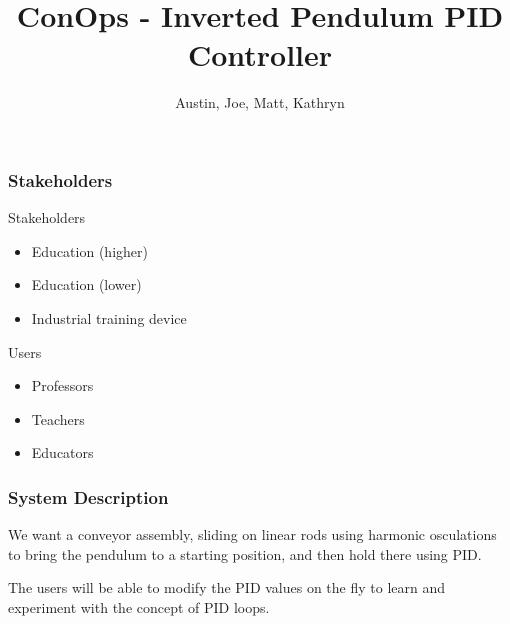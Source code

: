 \documentclass[aspectratio=169]{beamer}
\title{ConOps - Inverted Pendulum PID Controller}       %
\author{Austin, Joe, Matt, Kathryn}                     %
\institute{SNHU/CETA}                                   %
\begin{document}
\frame{\titlepage} %


\begin{frame}                     %
    \frametitle{Stakeholders}     %

    \begin{block}{Stakeholders}   %
        \begin{itemize}           %
            \item Education (higher)
            \item Education (lower)
            \item Industrial training device
        \end{itemize}
    \end{block}

    \begin{block}{Users}
        \begin{itemize}
            \item Professors
            \item Teachers
            \item Educators
        \end{itemize}
    \end{block}

\end{frame}


\begin{frame}
    \frametitle{System Description}

    We want a conveyor assembly, sliding on linear rods
    using harmonic osculations to bring the pendulum to a starting position, and then hold there
    using PID.

    \begin{block}{}
        The users will be able to modify the PID values on the fly to learn and experiment
        with the concept of PID loops.
    \end{block}

\end{frame}
\end{document}
